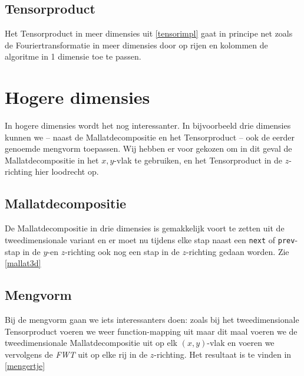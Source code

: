 \subsection{Tensorproduct}
Het Tensorproduct in meer dimensies uit \autoref{tensorimpl} gaat in principe net zoals de Fouriertransformatie in meer dimensies door op rijen en kolommen de algoritme in 1 dimensie toe te passen.

\section{Hogere dimensies}
In hogere dimensies wordt het nog interessanter. In bijvoorbeeld drie dimensies kunnen we -- naast de Mallatdecompositie en het Tensorproduct -- ook de eerder genoemde mengvorm toepassen. Wij hebben er voor gekozen om in dit geval de Mallatdecompositie in het $x,y$-vlak te gebruiken, en het Tensorproduct in de $z$-richting hier loodrecht op.

\subsection{Mallatdecompositie}
De Mallatdecompositie in drie dimensies is gemakkelijk voort te zetten uit de tweedimensionale variant en
er moet nu tijdens elke stap naast een \texttt{next} of \texttt{prev}-stap in de $y$-en $z$-richting ook nog een stap 
in de $z$-richting gedaan worden. Zie \autoref{mallat3d} 

\subsection{Mengvorm}
Bij de mengvorm gaan we iets interessanters doen: zoals bij het tweedimensionale Tensorproduct
voeren we weer function-mapping uit maar dit maal voeren we de tweedimensionale Mallatdecompositie
uit op elk $(x,y)$-vlak en voeren we vervolgens de \emph{FWT} uit op elke rij in de $z$-richting. Het resultaat is te vinden in \autoref{mengertje}
